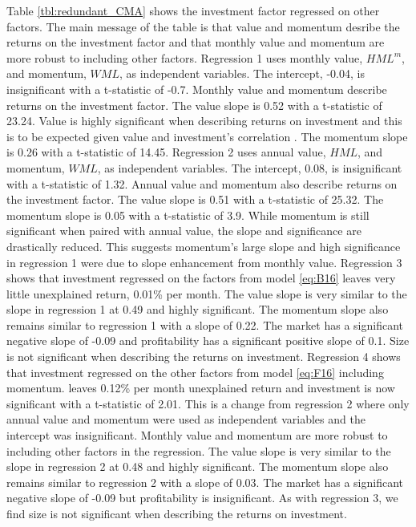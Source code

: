 
Table \ref{tbl:redundant_CMA} shows the investment factor regressed on other
factors.
The main message of the table is that value and momentum desribe the returns on
the investment factor and that monthly value and momentum are more robust to
including other factors.
Regression 1 uses monthly value, $HML^m$, and momentum, $WML$, as independent
variables.
The intercept, -0.04, is insignificant with a t-statistic of -0.7.
Monthly value and momentum describe returns on the investment factor.
The value slope is 0.52 with a t-statistic of 23.24.
Value is highly significant when describing returns on investment and this is
to be expected given value and investment's correlation
\parencite{fama2015five}.
The momentum slope is 0.26 with a t-statistic of 14.45.
Regression 2 uses annual value, $HML$, and momentum, $WML$, as independent
variables.
The intercept, 0.08, is insignificant with a t-statistic of 1.32.
Annual value and momentum also describe returns on the investment factor.
The value slope is 0.51 with a t-statistic of 25.32.
The momentum slope is 0.05 with a t-statistic of 3.9.
While momentum is still significant when paired with annual value,
the slope and significance are drastically reduced.
This suggests momentum's large slope and high
significance
in regression 1 were due to slope enhancement from monthly value.
Regression 3 shows that investment regressed on the factors from
model \ref{eq:B16}
leaves very little unexplained return, 0.01\% per month.
The value slope is very similar to the slope in regression 1 at 0.49 and highly
significant.
The momentum slope also remains similar to regression 1 with a slope of 0.22.
The market has a significant negative slope of -0.09 and
profitability has a significant positive slope of 0.1.
Size is not significant when describing the returns on investment.
Regression 4 shows that investment regressed on the other factors from
model \ref{eq:F16} including momentum.
leaves 0.12\% per month unexplained return
and investment is now significant with a t-statistic of 2.01.
This is a change from regression 2 where only annual value and momentum were
used as independent variables and the intercept was insignificant.
Monthly value and momentum are more robust to including other factors in the
regression.
The value slope is very similar to the slope in regression 2 at 0.48 and highly
significant.
The momentum slope also remains similar to regression 2 with a slope of 0.03.
The market has a significant negative slope of -0.09 but
profitability is insignificant.
As with regression 3, we find size is not significant when describing the
returns on investment.

